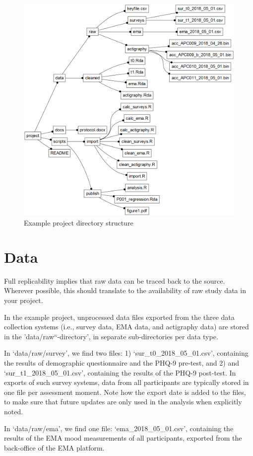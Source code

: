 \documentclass[]{book}
\begin{document}
\begin{figure}

{\centering \includegraphics[width=0.65\linewidth]{images/datamanagement/project_tree} 

}

\caption{Example project directory structure}\label{fig:dm-project-tree}
\end{figure}

\section{Data}\label{data}


Full replicability implies that raw data can be traced back to the
source. Wherever possible, this should translate to the availability of
raw study data in your project.

In the example project, unprocessed data files exported from the three
data collection systems (i.e., survey data, EMA data, and actigraphy
data) are stored in the 'data/raw``-directory', in separate
sub-directories per data type.

In `data/raw/survey', we find two files: 1) `sur\_t0\_2018\_05\_01.csv',
containing the results of demographic questionnaire and the PHQ-9
pre-test, and 2) and `sur\_t1\_2018\_05\_01.csv', containing the results
of the PHQ-9 post-test. In exports of such survey systems, data from all
participants are typically stored in one file per assessment moment.
Note how the export date is added to the files, to make sure that future
updates are only used in the analysis when explicitly noted.

In `data/raw/ema', we find one file: `ema\_2018\_05\_01.csv', containing
the results of the EMA mood measurements of all participants, exported
from the back-office of the EMA platform.
\end{document}
